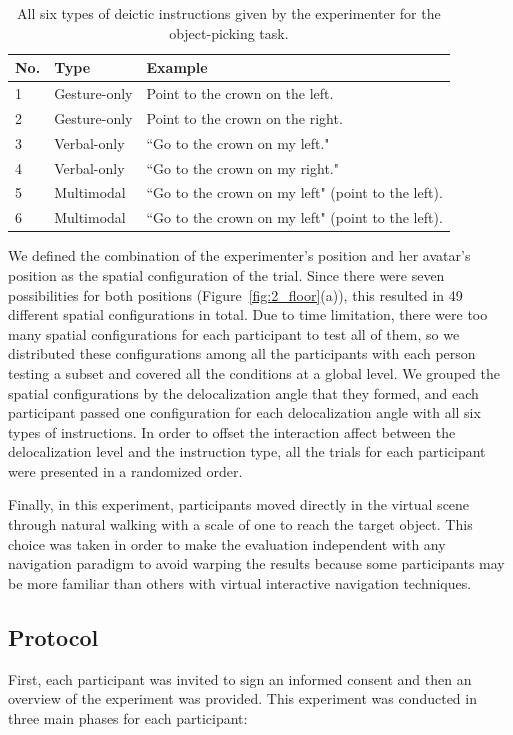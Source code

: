\begin{table}[!t]
\renewcommand{\arraystretch}{1.3}
\caption{All six types of deictic instructions given by the experimenter for the object-picking task.}
\label{tab:instruction_type}
\centering
\begin{tabular}{l l l}
	\hline
	No. & Type & Example \\
	\hline
    1 & Gesture-only & Point to the crown on the left. \\
    2 & Gesture-only & Point to the crown on the right. \\
    3 & Verbal-only & ``Go to the crown on my left." \\
    4 & Verbal-only & ``Go to the crown on my right." \\
    5 & Multimodal & ``Go to the crown on my left" (point to the left). \\
    6 & Multimodal & ``Go to the crown on my left" (point to the left). \\ \hline
\end{tabular}
\end{table}

We defined the combination of the experimenter's position and her avatar's position as the spatial configuration of the trial. Since there were seven possibilities for both positions (Figure~\ref{fig:2_floor}(a)), this resulted in 49 different spatial configurations in total. Due to time limitation, there were too many spatial configurations for each participant to test all of them, so we distributed these configurations among all the participants with each person testing a subset and covered all the conditions at a global level. We grouped the spatial configurations by the delocalization angle that they formed, and each participant passed one configuration for each delocalization angle with all six types of instructions. In order to offset the interaction affect between the delocalization level and the instruction type, all the trials for each participant were presented in a randomized order.

Finally, in this experiment, participants moved directly in the virtual scene through natural walking with a scale of one to reach the target object. This choice was taken in order to make the evaluation independent with any navigation paradigm to avoid warping the results because some participants may be more familiar than others with virtual interactive navigation techniques.


\subsection{Protocol}
First, each participant was invited to sign an informed consent and then an overview of the experiment was provided. This experiment was conducted in three main phases for each participant:


